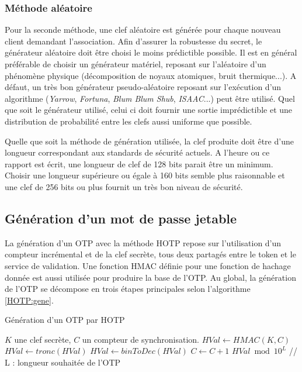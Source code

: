 \documentclass{../res/univ-projet}
\begin{document}
    \subsubsection{Méthode aléatoire}
    Pour la seconde méthode, une clef aléatoire est générée pour chaque nouveau client demandant l'association.
    Afin d'assurer la robustesse du secret, le générateur aléatoire doit être choisi le moins prédictible possible. Il est en général préférable de choisir un générateur 
    matériel, reposant sur l'aléatoire d'un phénomène physique (décomposition de noyaux atomiques, bruit thermique...). A défaut, un très bon générateur pseudo-aléatoire 
    reposant sur l'exécution d'un algorithme (\emph{Yarrow}, \emph{Fortuna}, \emph{Blum Blum Shub}, \emph{ISAAC}...) peut être utilisé. Quel que soit le générateur 
    utilisé, celui ci doit fournir une sortie imprédictible et une distribution de probabilité entre les clefs aussi uniforme que possible.
  
  Quelle que soit la méthode de génération utilisée, la clef produite doit être d'une longueur correspondant aux standards de sécurité actuels. A l'heure ou ce rapport 
  est écrit, une longueur de clef de 128 bits parait être un minimum. Choisir une longueur supérieure ou égale à 160 bits semble plus raisonnable et une clef de 256 
  bits ou plus fournit un très bon niveau de sécurité.
    
  \subsection{Génération d'un mot de passe jetable}
  La génération d'un OTP avec la méthode HOTP repose sur l'utilisation d'un compteur incrémental et de la clef secrète, tous deux partagés entre le token et le service de 
  validation. Une fonction HMAC définie pour une fonction de hachage donnée est aussi utilisée pour produire la base de l'OTP.
  Au global, la génération de l'OTP se décompose en trois étapes principales selon l'algorithme \ref{HOTP:gene}.
  \begin{algorithm}
  \caption{Génération d'un OTP par HOTP}
    \label{HOTP:gene}
   
    \begin{algorithmic}
    \REQUIRE $K$ une clef secrète, $C$ un compteur de synchronisation.
    \STATE $HVal \leftarrow HMAC(K, C)$
    \STATE $HVal \leftarrow tronc(HVal)$
    \STATE $HVal \leftarrow binToDec(HVal)$
    \STATE $C \leftarrow C + 1$
    \newline
    \RETURN $HVal \bmod 10^L$ // L : longueur souhaitée de l'OTP
    \end{algorithmic}
  \end{algorithm}
  
\end{document}

